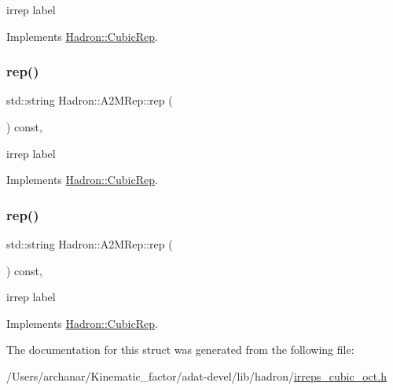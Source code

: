 irrep label 

Implements \mbox{\hyperlink{structHadron_1_1CubicRep_ac3eb63608803d44c68681f158e14eb1b}{Hadron\+::\+Cubic\+Rep}}.

\mbox{\label{structHadron_1_1A2MRep_ad219824d3a5220f47e6f3b38d2a60102}} 
\subsubsection{\texorpdfstring{rep()}{rep()}\hspace{0.1cm}{\footnotesize\ttfamily [2/3]}}
{\footnotesize\ttfamily std\+::string Hadron\+::\+A2\+M\+Rep\+::rep (\begin{DoxyParamCaption}{ }\end{DoxyParamCaption}) const\hspace{0.3cm}{\ttfamily [inline]}, {\ttfamily [virtual]}}

irrep label 

Implements \mbox{\hyperlink{structHadron_1_1CubicRep_ac3eb63608803d44c68681f158e14eb1b}{Hadron\+::\+Cubic\+Rep}}.

\mbox{\label{structHadron_1_1A2MRep_ad219824d3a5220f47e6f3b38d2a60102}} 
\subsubsection{\texorpdfstring{rep()}{rep()}\hspace{0.1cm}{\footnotesize\ttfamily [3/3]}}
{\footnotesize\ttfamily std\+::string Hadron\+::\+A2\+M\+Rep\+::rep (\begin{DoxyParamCaption}{ }\end{DoxyParamCaption}) const\hspace{0.3cm}{\ttfamily [inline]}, {\ttfamily [virtual]}}

irrep label 

Implements \mbox{\hyperlink{structHadron_1_1CubicRep_ac3eb63608803d44c68681f158e14eb1b}{Hadron\+::\+Cubic\+Rep}}.



The documentation for this struct was generated from the following file\+:\begin{DoxyCompactItemize}
\item 
/\+Users/archanar/\+Kinematic\+\_\+factor/adat-\/devel/lib/hadron/\mbox{\hyperlink{adat-devel_2lib_2hadron_2irreps__cubic__oct_8h}{irreps\+\_\+cubic\+\_\+oct.\+h}}\end{DoxyCompactItemize}
